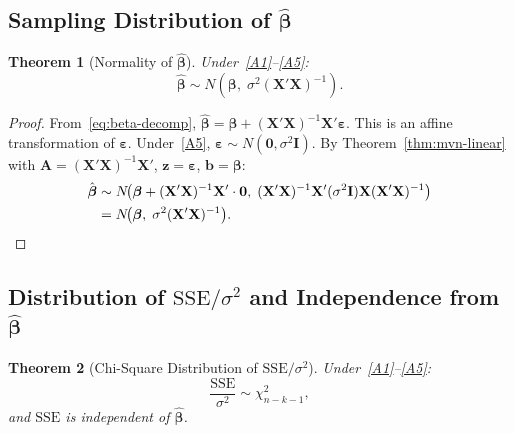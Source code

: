 \documentclass[14pt]{extarticle}
\theoremstyle{plain}
\newtheorem{theorem}{Theorem}[section]
\theoremstyle{definition}
\theoremstyle{remark}
\newcommand{\SSE}{\mathrm{SSE}}
\newcommand{\bX}{\mathbf{X}}
\def\bb{\boldsymbol{\beta}}
\newcommand{\be}{\boldsymbol{\varepsilon}}
\newcommand{\bI}{\mathbf{I}}
\newcommand{\bzero}{\mathbf{0}}
\newcommand{\bz}{\mathbf{z}}
\newcommand{\bA}{\mathbf{A}}
\begin{document}
\subsection{Sampling Distribution of \texorpdfstring{$\hat{\bb}$}{the OLS estimator}}

\begin{theorem}[Normality of $\hat{\bb}$]\label{thm:beta-dist}
Under~\ref{A1}--\ref{A5}:
\begin{equation}
\boxed{\hat{\bb} \sim N\!\left(\bb,\; \sigma^2(\bX'\bX)^{-1}\right).}
\end{equation}
\end{theorem}

\begin{proof}
From~\eqref{eq:beta-decomp}, $\hat{\bb} = \bb + (\bX'\bX)^{-1}\bX'\be$. This is an affine transformation of $\be$. Under~\ref{A5}, $\be \sim N(\bzero, \sigma^2\bI)$. By Theorem~\ref{thm:mvn-linear} with $\bA = (\bX'\bX)^{-1}\bX'$, $\bz = \be$, $\mathbf{b} = \bb$:
\begin{align*}
\hat{\bb} &\sim N\!\bigl(\bb + (\bX'\bX)^{-1}\bX' \cdot \bzero,\; (\bX'\bX)^{-1}\bX'(\sigma^2\bI)\bX(\bX'\bX)^{-1}\bigr)\\
&= N\!\bigl(\bb,\; \sigma^2(\bX'\bX)^{-1}\bigr). \qedhere
\end{align*}
\end{proof}

\subsection{Distribution of \texorpdfstring{$\SSE/\sigma^2$}{SSE/sigma\texttwosuperior} and Independence from \texorpdfstring{$\hat{\bb}$}{the OLS estimator}}

\begin{theorem}[Chi-Square Distribution of $\SSE/\sigma^2$]\label{thm:sse-dist}
Under~\ref{A1}--\ref{A5}:
\begin{equation}
\frac{\SSE}{\sigma^2} \sim \chi^2_{n-k-1},
\end{equation}
and $\SSE$ is independent of $\hat{\bb}$.
\end{theorem}
\end{document}
